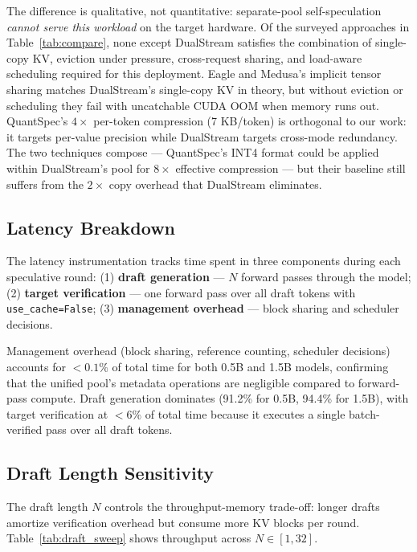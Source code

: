 \documentclass[review]{elsarticle}
\theoremstyle{definition}
\theoremstyle{remark}
\begin{document}
The difference is qualitative, not quantitative: separate-pool
self-speculation \emph{cannot serve this workload} on the target hardware.
Of the surveyed approaches in Table~\ref{tab:compare}, none except
DualStream satisfies the combination of single-copy KV, eviction under
pressure, cross-request sharing, and load-aware scheduling required for
this deployment. Eagle and Medusa's implicit tensor sharing matches
DualStream's single-copy KV in theory, but without eviction or scheduling
they fail with uncatchable CUDA OOM when memory runs out. QuantSpec's
$4\times$ per-token compression (7 KB/token) is orthogonal to our work:
it targets per-value precision while DualStream targets cross-mode
redundancy. The two techniques compose --- QuantSpec's INT4 format
could be applied within DualStream's pool for $8\times$ effective
compression --- but their baseline still suffers from the $2\times$ copy
overhead that DualStream eliminates.

\subsection{Latency Breakdown}
\label{sec:eval-latency}

The latency instrumentation tracks time spent in three components during
each speculative round: (1) \textbf{draft generation} --- $N$ forward passes
through the model; (2) \textbf{target verification} --- one forward pass
over all draft tokens with \texttt{use\_cache=False}; (3) \textbf{management
overhead} --- block sharing and scheduler decisions.

Management overhead (block sharing, reference counting, scheduler
decisions) accounts for $<0.1\%$ of total time for both 0.5B and 1.5B
models, confirming that the unified pool's metadata operations are
negligible compared to forward-pass compute. Draft generation dominates
(91.2\% for 0.5B, 94.4\% for 1.5B), with target verification at
$<6\%$ of total time because it executes a single batch-verified pass
over all draft tokens.

\subsection{Draft Length Sensitivity}

The draft length $N$ controls the throughput-memory trade-off: longer drafts
amortize verification overhead but consume more KV blocks per round.
Table~\ref{tab:draft_sweep} shows throughput across $N \in [1, 32]$.
\end{document}

